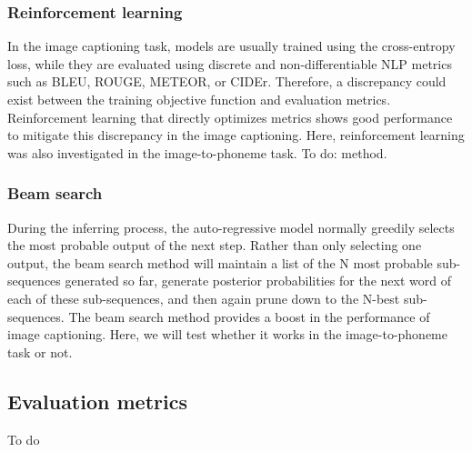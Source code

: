 \documentclass[journal,comsoc]{IEEEtran}
\begin{document}
\subsubsection{Reinforcement learning}
In the image captioning task, models are usually trained using the cross-entropy loss, while they are evaluated using discrete and non-differentiable NLP  metrics such as BLEU, ROUGE, METEOR, or CIDEr. Therefore, a discrepancy could exist between the training objective function and evaluation metrics. Reinforcement learning that directly optimizes metrics shows good performance to mitigate this discrepancy in the image captioning. Here, reinforcement learning was also investigated in the image-to-phoneme task. To do: method.

\subsubsection{Beam search}
During the inferring process, the auto-regressive model normally greedily selects the most probable output of the next step. Rather than only selecting one output, the beam search method will maintain a list of the N most probable sub-sequences generated so far, generate posterior probabilities for the next word of each of these sub-sequences, and then again prune down to the N-best sub-sequences. The beam search method provides a boost in the performance of image captioning. Here, we will test whether it works in the image-to-phoneme task or not.
\subsection{Evaluation metrics}
To do
\end{document}
